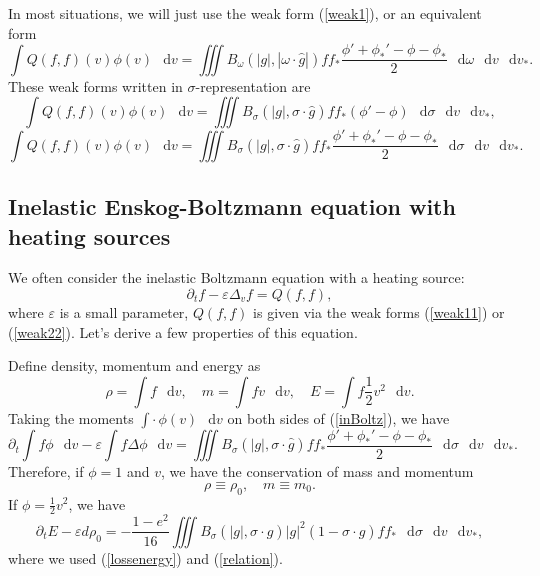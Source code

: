 \documentclass[review, times]{elsarticle}
\newcommand*\diff{\mathop{}\!\mathrm{d}}
\begin{document}
In most situations, we will just use the weak form (\ref{weak1}), or an equivalent form
\begin{equation} \label{weak2}
\int Q(f,f)(v)\phi(v)\,\diff{v}=\iiint B_{\omega}(|g|,|\omega\cdot \hat{g}|)ff_*\frac{\phi'+\phi_*'-\phi-\phi_*}{2}\,\diff{\omega}\,\diff{v}\,\diff{v_*}.
\end{equation}
These weak forms written in $\sigma$-representation are
\begin{equation} \label{weak11}
\int Q(f,f)(v)\phi(v)\,\diff{v}=\iiint B_{\sigma}(|g|,\sigma\cdot \hat{g})ff_*(\phi'-\phi)\,\diff{\sigma}\,\diff{v}\,\diff{v_*},
\end{equation}
\begin{equation} \label{weak22}
\int Q(f,f)(v)\phi(v)\,\diff{v}=\iiint B_{\sigma}(|g|,\sigma\cdot \hat{g})ff_*\frac{\phi'+\phi_*'-\phi-\phi_*}{2}\,\diff{\sigma}\,\diff{v}\,\diff{v_*}.
\end{equation}

\subsection{Inelastic Enskog-Boltzmann equation with heating sources}

We often consider the inelastic Boltzmann equation with a heating source:
\begin{equation} \label{inBoltz}
\partial_tf-\varepsilon \Delta_vf=Q(f,f),
\end{equation}
where $\varepsilon$ is a small parameter, $Q(f,f)$ is given via the weak forms (\ref{weak11}) or (\ref{weak22}). Let's derive a few properties of this equation. 

Define density, momentum and energy as
\begin{equation}
\rho=\int f\,\diff{v}, \quad  m=\int fv\,\diff{v}, \quad E=\int f\frac{1}{2}v^2\,\diff{v}.
\end{equation}
Taking the moments $\int \cdot \, \phi(v)\,\diff{v}$ on both sides of (\ref{inBoltz}), we have
\begin{equation}
\partial_t \int f\phi\,\diff{v} -\varepsilon \int f \Delta \phi \,\diff{v}=\iiint B_{\sigma}(|g|,\sigma\cdot \hat{g})ff_*\frac{\phi'+\phi_*'-\phi-\phi_*}{2}\,\diff{\sigma}\,\diff{v}\,\diff{v_*}.
\end{equation}
Therefore, if $\phi=1$ and $v$, we have the conservation of mass and momentum
\begin{equation}
\rho \equiv \rho_0, \quad m\equiv m_0.
\end{equation}
If $\phi=\frac{1}{2}v^2$, we have
\begin{equation}
\partial_t E -\varepsilon d\rho_0=-\frac{1-e^2}{16}\iiint B_{\sigma}(|g|,\sigma\cdot \hat{g})|g|^2(1-\sigma\cdot \hat{g})ff_*\,\diff{\sigma}\,\diff{v}\,\diff{v_*},
\end{equation}
where we used (\ref{lossenergy}) and (\ref{relation}).
\end{document}
